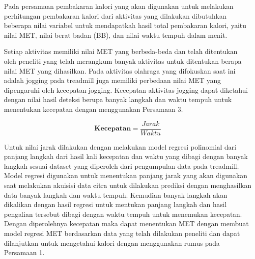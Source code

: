 \begin{enumerate}
  Pada persamaan pembakaran kalori yang akan digunakan untuk melakukan perhitungan pembakaran kalori dari aktivitas yang dilakukan dibutuhkan beberapa nilai variabel untuk mendapatkah hasil total pembakaran kalori, yaitu nilai MET, nilai berat badan (BB), dan nilai waktu tempuh dalam menit.

  Setiap aktivitas memiliki nilai MET yang berbeda-beda dan telah ditentukan oleh peneliti yang telah merangkum banyak aktivitas untuk ditentukan berapa nilai MET yang dihasilkan. Pada aktivitas olahraga yang difokuskan saat ini adalah jogging pada treadmill juga memiliki perbedaan nilai MET yang dipengaruhi oleh kecepatan jogging. Kecepatan aktivitas jogging dapat diketahui dengan nilai hasil deteksi berupa banyak langkah dan waktu tempuh untuk menentukan kecepatan dengan menggunakan Persamaan 3.

  \begin{equation}
    \label{eq:RumusKecepatan}
    \mathbf{Kecepatan} = \frac{Jarak}{Waktu}
  \end{equation}

  Untuk nilai jarak dilakukan dengan melakukan model regresi polinomial dari panjang langkah dari hasil kali kecepatan dan waktu yang dibagi dengan banyak langkah sesuai dataset yang diperoleh dari pengumpulan data pada treadmill. Model regresi digunakan untuk menentukan panjang jarak yang akan digunakan saat melakukan akuisisi data citra untuk dilakukan prediksi dengan menghasilkan data banyak langkah dan waktu tempuh. Kemudian banyak langkah akan dikalikan dengan hasil regresi untuk mentukan panjang langkah dan hasil pengalian tersebut dibagi dengan waktu tempuh untuk menemukan kecepatan. Dengan diperolehnya kecepatan maka dapat menentukan MET dengan membuat model regresi MET berdasarkan data yang telah dilakukan peneliti dan dapat dilanjutkan untuk mengetahui kalori dengan menggunakan rumus pada Persamaan 1.

\end{enumerate}

